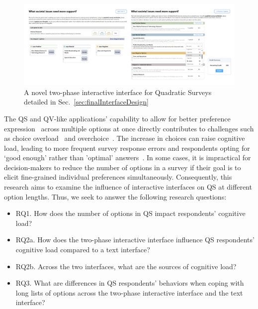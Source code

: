 \begin{figure}[ht]
    \centering
    \includegraphics[width=\textwidth]{content/image/header.pdf}
    \caption{A novel two-phase interactive interface for Quadratic Surveys detailed in Sec.~\ref{sec:finalInterfaceDesign}}
    \label{fig:header}
\end{figure}

The QS and QV-like applications' capability to allow for better preference expression~\cite{chengCanShowWhat2021} across multiple options at once directly contributes to challenges such as choice overload~\cite{iyengarWhenChoiceDemotivating2000} and overchoice~\cite{gourvilleOverchoiceAssortmentType2005}. The increase in choices can raise cognitive load, leading to more frequent survey response errors and respondents opting for `good enough' rather than 'optimal' answers~\cite{lenznerCognitiveBurdenSurvey2010, blessAskingDifficultQuestions1992}. In some cases, it is impractical for decision-makers to reduce the number of options in a survey if their goal is to elicit fine-grained individual preferences simultaneously. Consequently, this research aims to examine the influence of interactive interfaces on QS at different option lengths. Thus, we seek to answer the following research questions:

\begin{itemize}
    \item RQ1. How does the number of options in QS impact respondents' cognitive load?
    \item RQ2a. How does the two-phase interactive interface influence QS respondents' cognitive load compared to a text interface?
    \item RQ2b. Across the two interfaces, what are the sources of cognitive load?
    \item RQ3. What are differences in QS respondents' behaviors when coping with long lists of options across the two-phase interactive interface and the text interface?
\end{itemize}

